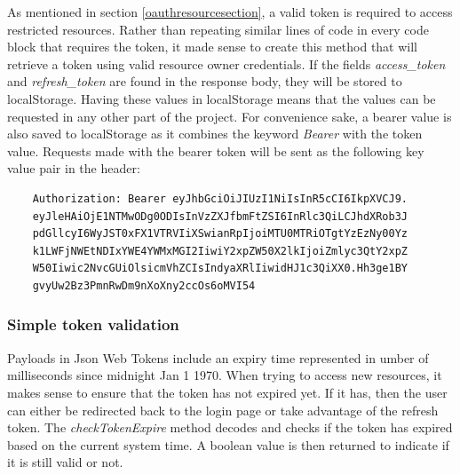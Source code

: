 As mentioned in section \ref{oauthresourcesection}, a valid token is required to access restricted resources.
Rather than repeating similar lines of code in every code block that requires the token, it made sense to create this method that will
retrieve a token using valid resource owner credentials.
If the fields \textit{access\_token} and \textit{refresh\_token} are found in the response body, they will be stored to localStorage.
Having these values in localStorage means that the values can be requested in any other part of the project.
For convenience sake, a bearer value is also saved to localStorage as it combines the keyword \textit{Bearer} with the token value.
Requests made with the bearer token will be sent as the following key value pair in the header:

\begin{verbatim}
    Authorization: Bearer eyJhbGciOiJIUzI1NiIsInR5cCI6IkpXVCJ9.
    eyJleHAiOjE1NTMwODg0ODIsInVzZXJfbmFtZSI6InRlc3QiLCJhdXRob3J
    pdGllcyI6WyJST0xFX1VTRVIiXSwianRpIjoiMTU0MTRiOTgtYzEzNy00Yz
    k1LWFjNWEtNDIxYWE4YWMxMGI2IiwiY2xpZW50X2lkIjoiZmlyc3QtY2xpZ
    W50Iiwic2NvcGUiOlsicmVhZCIsIndyaXRlIiwidHJ1c3QiXX0.Hh3ge1BY
    gvyUw2Bz3PmnRwDm9nXoXny2ccOs6oMVI54
\end{verbatim}


\subsubsection*{Simple token validation}
Payloads in Json Web Tokens include an expiry time represented in umber of milliseconds since midnight Jan 1 1970.
When trying to access new resources, it makes sense to ensure that the token has not expired yet.
If it has, then the user can either be redirected back to the login page or take advantage of the refresh token.
The \textit{checkTokenExpire} method decodes and checks if the token has expired based on the current system time.
A boolean value is then returned to indicate if it is still valid or not.

\clearpage
